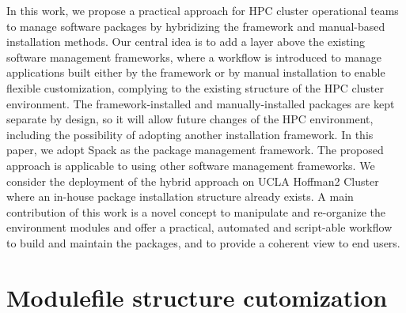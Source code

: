 \documentclass[conference]{IEEEtran}
\begin{document}
In this work, we propose a practical approach for HPC cluster operational teams to manage software packages by hybridizing the framework and manual-based installation methods. 
Our central idea is to add a layer above the existing software management frameworks, where a workflow is introduced to manage applications built either by the framework or by manual installation to enable flexible customization, complying to the existing structure of the HPC cluster environment.
The framework-installed and manually-installed packages are kept separate by design, so it will allow future changes of the HPC environment, including the possibility of adopting another installation framework.
In this paper, we adopt Spack as the package management framework. The proposed approach is applicable to using other software management frameworks. We consider the deployment of the hybrid approach on UCLA Hoffman2 Cluster where an in-house package installation structure already exists.
A main contribution of this work is a novel concept to manipulate and re-organize the environment modules and offer a practical, automated and script-able workflow to build and maintain the packages, and to provide a coherent view to end users.



\section{Modulefile structure cutomization} \label{subsec_redefine_h2_modulefiles}

\end{document}
